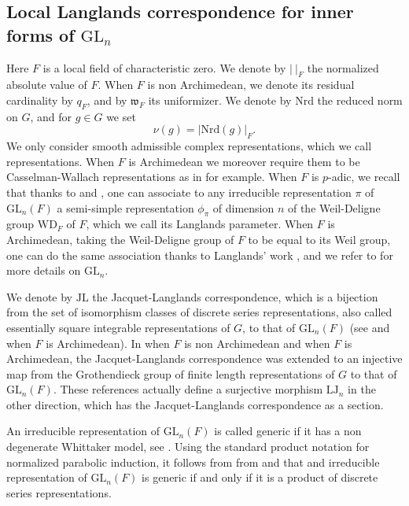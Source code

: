 \documentclass[11pt,letterpaper]{amsart}
\newcommand{\GL}{{\mathrm {GL}}} \newcommand{\PGL}{{\mathrm {PGL}}}
\newcommand{\JL}{{\mathrm{JL}}}
\newcommand{\nrd}{{\mathrm{Nrd}}}
\theoremstyle{plain}
\numberwithin{equation}{section}
\begin{document}

\subsection{Local Langlands correspondence for inner forms of $\GL_n$}\label{sec LJL}


Here $F$ is a local field of characteristic zero. We denote by $|\ |_F$ the normalized absolute value of $F$. When $F$ is non Archimedean, we denote its residual cardinality by $q_F$, and by $\mathfrak{w}_F$ its uniformizer. We denote by $\nrd$ the reduced norm on $G$, and for $g\in G$ we set \[\nu(g)=|\nrd(g)|_F.\]  We only consider smooth admissible complex representations, which we call representations. When $F$ is Archimedean we moreover require them to be Casselman-Wallach representations as in \cite{FJ} for example. When $F$ is $p$-adic, we recall that thanks to \cite{HTllc} and \cite{Hllc}, one can associate to any irreducible representation $\pi$ of $\GL_n(F)$ a semi-simple representation $\phi_\pi$ of dimension $n$ of the Weil-Deligne group $\mathrm{WD}_F$ of $F$, which we call its Langlands parameter. When $F$ is Archimedean, taking the Weil-Deligne group of $F$ to be equal to its Weil group, one can do the same association thanks to Langlands' work \cite{LArch}, and we refer to \cite{KnappLLC} for more details on $\GL_n$. 

We denote by $\JL$ the Jacquet-Langlands correspondence, which is a bijection from the set of isomorphism classes of discrete series representations, also called essentially square integrable representations of 
$G$, to that of $\GL_n(F)$ (see \cite{DKV} and \cite{Badulescu-Renard} when $F$ is Archimedean). In \cite{Bjlu} when $F$ is non Archimedean and \cite{Badulescu-Renard} when $F$ is Archimedean, the Jacquet-Langlands correspondence was extended to an injective map from the Grothendieck group of finite length representations of $G$ to that of $\GL_n(F)$. These references actually define a surjective morphism $\mathrm{LJ}_n$ in the other direction, which has the Jacquet-Langlands correspondence as a section. 

An irreducible representation of $\GL_n(F)$ is called generic if it has a non degenerate Whittaker model, see \cite{JSeuler1}. Using the standard product notation for normalized parabolic induction, it follows from from \cite{Z} and \cite{JrsArch} that 
and irreducible representation of $\GL_n(F)$ is generic if and only if it is a product of discrete series representations. 
\end{document}
